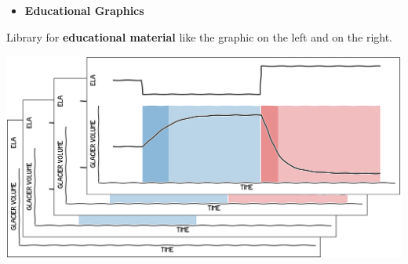 \documentclass[final]{beamer}
\newcommand*{\smalllogo}[1]{%
	\raisebox{-.3\baselineskip}{%
		\texttt{[image: \#1]}%
	}%
}
\begin{document}
\begin{frame}[fragile]
\begin{columns}
\begin{rightcolumn}
\hspace*{42cm}
\vspace*{-2.5cm}

	\begin{boxblock}{}
		\begin{minipage}[t]{0.45\textwidth}
				\begin{itemize}	\item[\smalllogo{gluehbirne.png}] {\textbf{Educational Graphics}} \end{itemize}
						Library for \textbf{educational material} like the graphic on the left and on the right.
		\end{minipage}
	\hfill
		\begin{minipage}[t]{0.35\textwidth}
						\vspace{0pt}
						\includegraphics[width=1.0\textwidth]{ELA_Bilder}
		\end{minipage}
	\end{boxblock}

\hspace*{42cm}
\vspace*{-1cm}


\end{rightcolumn}
\end{columns}
\end{frame}
\end{document}
